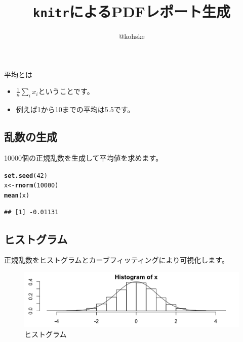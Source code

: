 \documentclass{ltjsarticle}\usepackage[]{graphicx}\usepackage[]{color}
\title{\texttt{knitr}によるPDFレポート生成}
\author{@kohske}
\makeatletter
\def\maxwidth{ %
  \ifdim\Gin@nat@width>\linewidth
    \linewidth
  \else
    \Gin@nat@width
  \fi
}
\newcommand{\hlnum}[1]{\textcolor[rgb]{0.686,0.059,0.569}{#1}}%
\newcommand{\hlstd}[1]{\textcolor[rgb]{0.345,0.345,0.345}{#1}}%
\newcommand{\hlkwb}[1]{\textcolor[rgb]{0.69,0.353,0.396}{#1}}%
\newcommand{\hlkwd}[1]{\textcolor[rgb]{0.737,0.353,0.396}{\textbf{#1}}}%
\newenvironment{kframe}{%
 \def\at@end@of@kframe{}%
 \ifinner\ifhmode%
  \def\at@end@of@kframe{\end{minipage}}%
  \begin{minipage}{\columnwidth}%
 \fi\fi%
 \def\FrameCommand##1{\hskip\@totalleftmargin \hskip-\fboxsep
 \colorbox{shadecolor}{##1}\hskip-\fboxsep
     \hskip-\linewidth \hskip-\@totalleftmargin \hskip\columnwidth}%
 \MakeFramed {\advance\hsize-\width
   \@totalleftmargin\z@ \linewidth\hsize
   \@setminipage}}%
 {\par\unskip\endMakeFramed%
 \at@end@of@kframe}
\newenvironment{knitrout}{}{} %
\makeatother
\begin{document}
\maketitle

平均とは
\begin{itemize}
\item $\frac{1}{n}\sum_{i}x_i$ということです。
\item 例えば1から10までの平均は5.5です。
\end{itemize}

\subsection*{乱数の生成}

10000個の正規乱数を生成して平均値を求めます。

\begin{knitrout}
\color{fgcolor}\begin{kframe}
\begin{alltt}
\hlkwd{set.seed}\hlstd{(}\hlnum{42}\hlstd{)}
\hlstd{x} \hlkwb{<-} \hlkwd{rnorm}\hlstd{(}\hlnum{10000}\hlstd{)}
\hlkwd{mean}\hlstd{(x)}
\end{alltt}
\begin{verbatim}
## [1] -0.01131
\end{verbatim}
\end{kframe}
\end{knitrout}


\subsection*{ヒストグラム}

正規乱数をヒストグラムとカーブフィッティングにより可視化します。

\begin{knitrout}
\color{fgcolor}\begin{figure}[h]

\includegraphics[width=\maxwidth]{figure/knit-sample-fig-01} \caption[ヒストグラム]{ヒストグラム\label{fig:knit-sample-fig-01}}
\end{figure}


\end{knitrout}
\end{document}
